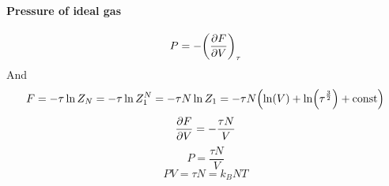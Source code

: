 \paragraph{Pressure of ideal gas}
$$P = -\qty(\pdv{F}{V})_\tau $$
And
\begin{align*}
F = -\tau \ln Z_N = -\tau \ln Z_1^N = -\tau N \ln Z_1 = -\tau N \qty(\ln(V) + \ln (\tau^{\frac{3}{2}}) + \text{const})
\end{align*}
$$\pdv{F}{V} = -\frac{\tau N}{V}$$
$$P = \frac{\tau N}{V}$$
$$PV = \tau N = k_B NT$$